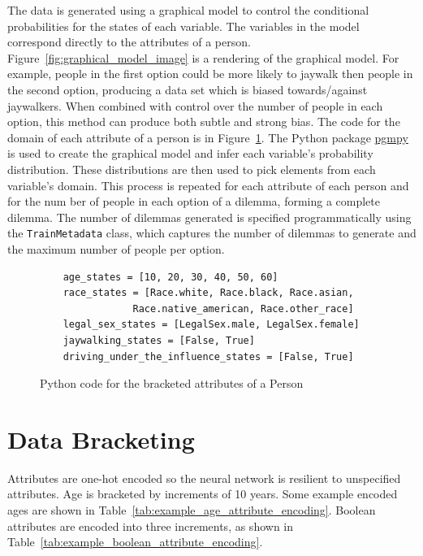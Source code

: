 \documentclass{report}
\newcommand{\code}{\texttt}
\begin{document}
The data is generated using a graphical model to control the conditional probabilities for the
states of each variable. The variables in the model correspond directly to the attributes of a
person. Figure~\ref{fig:graphical_model_image} is a rendering of the graphical model. For example,
people in the first option could be more likely to jaywalk then people in the second option,
producing a data set which is biased towards/against jaywalkers. When combined with control over the
number of people in each option, this method can produce both subtle and strong bias. The code for
the domain of each attribute of a person is in Figure~\ref{fig:code_for_person_attribute_domains}.
The Python package \href{https://github.com/pgmpy/pgmpy}{pgmpy} is used to create the graphical
model and infer each variable’s probability distribution. These distributions are then used to pick
elements from each variable’s domain. This process is repeated for each attribute of each person and
for the num ber of people in each option of a dilemma, forming a complete dilemma. The number of
dilemmas generated is specified programmatically using the \code{TrainMetadata} class, which
captures the number of dilemmas to generate and the maximum number of people per option.

\begin{figure}[h]
    \centering
    \begin{verbatim}
    age_states = [10, 20, 30, 40, 50, 60]
    race_states = [Race.white, Race.black, Race.asian,
                Race.native_american, Race.other_race]
    legal_sex_states = [LegalSex.male, LegalSex.female]
    jaywalking_states = [False, True]
    driving_under_the_influence_states = [False, True]
    \end{verbatim}
    \caption{Python code for the bracketed attributes of a Person}
    \label{fig:code_for_person_attribute_domains}
\end{figure}

\FloatBarrier
\section{Data Bracketing}
\label{sec:data-bracketing}

Attributes are one-hot encoded so the neural network is resilient to unspecified attributes. Age is
bracketed by increments of 10 years. Some example encoded ages are shown in
Table~\ref{tab:example_age_attribute_encoding}. Boolean attributes are encoded into three
increments, as shown in Table~\ref{tab:example_boolean_attribute_encoding}.
    
\end{document}
